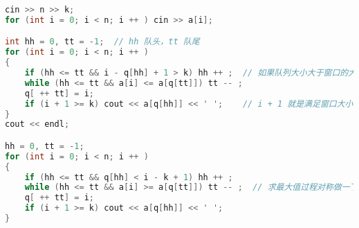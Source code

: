 \begin{lstlisting}[language=cpp]
cin >> n >> k;
for (int i = 0; i < n; i ++ ) cin >> a[i];

int hh = 0, tt = -1;  // hh 队头，tt 队尾
for (int i = 0; i < n; i ++ )
{
    if (hh <= tt && i - q[hh] + 1 > k) hh ++ ;  // 如果队列大小大于窗口的大小，则队头出队
    while (hh <= tt && a[i] <= a[q[tt]]) tt -- ;
    q[ ++ tt] = i;
    if (i + 1 >= k) cout << a[q[hh]] << ' ';    // i + 1 就是满足窗口大小的队列，每次输出队头
}
cout << endl;

hh = 0, tt = -1;
for (int i = 0; i < n; i ++ )
{
    if (hh <= tt && q[hh] < i - k + 1) hh ++ ;
    while (hh <= tt && a[i] >= a[q[tt]]) tt -- ;  // 求最大值过程对称做一下
    q[ ++ tt] = i;
    if (i + 1 >= k) cout << a[q[hh]] << ' ';
}
\end{lstlisting}
